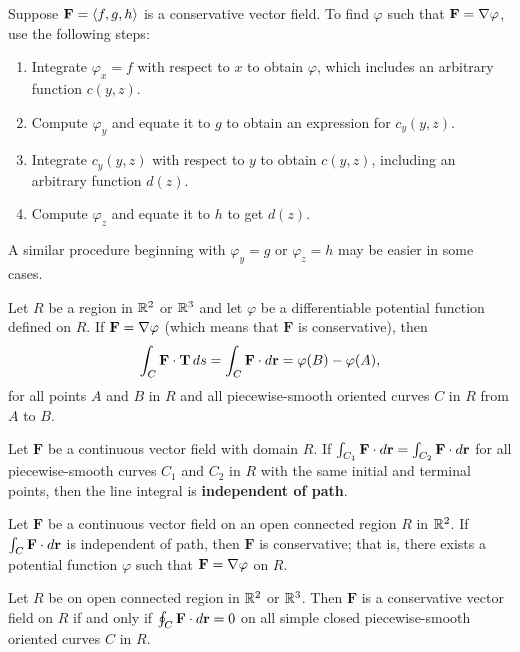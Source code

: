\documentclass[mathNotesPreamble]{subfiles}
\begin{document}
  \begin{thmBox*}
    Suppose $\mathbf F={\left\langle f,g,h \right\rangle}$ is a conservative vector field. To find $\varphi$ such that $\mathbf F=\nabla \varphi$, use the following steps:
    \begin{enumerate}
      \item 
        Integrate $\varphi_x=f$ with respect to $x$ to obtain $\varphi$, which includes an arbitrary function $c(y,z)$.
      \item 
        Compute $\varphi_y$ and equate it to $g$ to obtain an expression for $c_y(y,z)$.
      \item 
        Integrate $c_y(y,z)$ with respect to $y$ to obtain $c(y,z)$, including an arbitrary function $d(z)$.
      \item 
        Compute $\varphi_z$ and equate it to $h$ to get $d(z)$.
    \end{enumerate}
    A similar procedure beginning with $\varphi_y=g$ or $\varphi_z=h$ may be easier in some cases.
  \end{thmBox*}

  \begin{thmBox*}
    Let $R$ be a region in $\mathbb{R}^2$ or $\mathbb{R}^3$ and let $\varphi$ be a differentiable potential function defined on $R$. If $\mathbf F=\nabla\varphi$ (which means that $\mathbf F$ is conservative), then
       \[\int_C \mathbf F\cdot{\mathbf{T}}\,ds=\int_C \mathbf F\cdot d{\mathbf{r}}=\varphi(B)-\varphi(A),\]
     for all points $A$ and $B$ in $R$ and all piecewise-smooth oriented curves $C$ in $R$ from $A$ to $B$.
  \end{thmBox*}

  \begin{defn*}
    Let $\mathbf F$ be a continuous vector field with domain $R$. If $\int_{C_1} \mathbf F\cdot d{\mathbf{r}}=\int_{C_2} \mathbf F\cdot d{\mathbf{r}}$ for all piecewise-smooth curves $C_1$ and $C_2$ in $R$ with the same initial and terminal points, then the line integral is \textbf{independent of path}.
  \end{defn*}

  \begin{thmBox*}[Theorem 17.5]
    Let $\mathbf F$ be a continuous vector field on an open connected region $R$ in $\mathbb{R}^2$. If $\int_C \mathbf F\cdot d{\mathbf{r}}$ is independent of path, then $\mathbf F$ is conservative; that is, there exists a potential function $\varphi$ such that $\mathbf F=\nabla \varphi$ on $R$. 
  \end{thmBox*}

  \begin{thmBox*}
    Let $R$ be on open connected region in $\mathbb{R}^2$ or $\mathbb{R}^3$. Then $\mathbf F$ is a conservative vector field on $R$ if and only if $\oint_C \mathbf F\cdot d{\mathbf{r}}=0$ on all simple closed piecewise-smooth oriented curves $C$ in $R$.
  \end{thmBox*}

  \pagebreak
  
\end{document}
